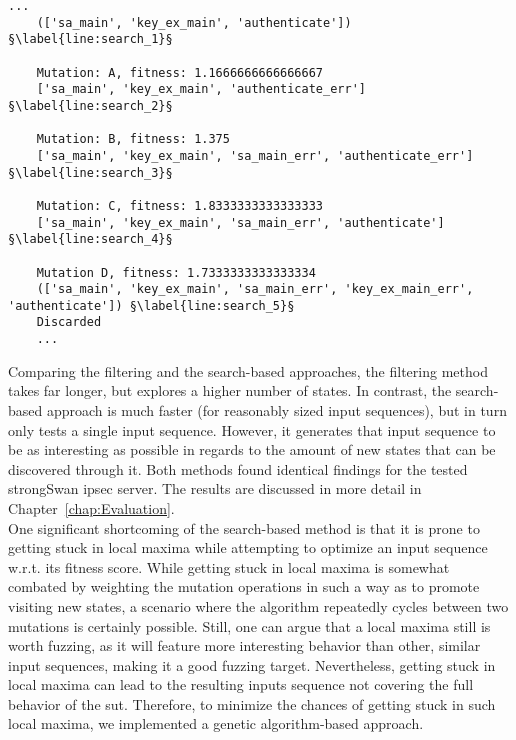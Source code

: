 \begin{lstlisting}[float=h, caption=Search-based input-sequence generation example mutations., label=lst:search, escapechar=§]
	... 	
	(['sa_main', 'key_ex_main', 'authenticate']) §\label{line:search_1}§
	
	Mutation: A, fitness: 1.1666666666666667
	['sa_main', 'key_ex_main', 'authenticate_err'] §\label{line:search_2}§
	
	Mutation: B, fitness: 1.375
	['sa_main', 'key_ex_main', 'sa_main_err', 'authenticate_err'] §\label{line:search_3}§
	
	Mutation: C, fitness: 1.8333333333333333
	['sa_main', 'key_ex_main', 'sa_main_err', 'authenticate'] §\label{line:search_4}§
	
	Mutation D, fitness: 1.7333333333333334 
	(['sa_main', 'key_ex_main', 'sa_main_err', 'key_ex_main_err', 'authenticate']) §\label{line:search_5}§
	Discarded
	...
\end{lstlisting}

Comparing the filtering and the search-based approaches, the filtering method takes far longer, but explores a higher number of states. In contrast, the search-based approach is much faster (for reasonably sized input sequences), but in turn only tests a single input sequence. However, it generates that input sequence to be as interesting as possible in regards to the amount of new states that can be discovered through it. Both methods found identical findings for the tested strongSwan \ac{ipsec} server. The results are discussed in more detail in Chapter~\ref{chap:Evaluation}.\\

One significant shortcoming of the search-based method is that it is prone to getting stuck in local maxima while attempting to optimize an input sequence w.r.t. its fitness score. While getting stuck in local maxima is somewhat combated by weighting the mutation operations in such a way as to promote visiting new states, a scenario where the algorithm repeatedly cycles between two mutations is certainly possible. Still, one can argue that a local maxima still is worth fuzzing, as it will feature more interesting behavior than other, similar input sequences, making it a good fuzzing target. Nevertheless, getting stuck in local maxima can lead to the resulting inputs sequence not covering the full behavior of the \ac{sut}. Therefore, to minimize the chances of getting stuck in such local maxima, we implemented a genetic algorithm-based approach. \\

